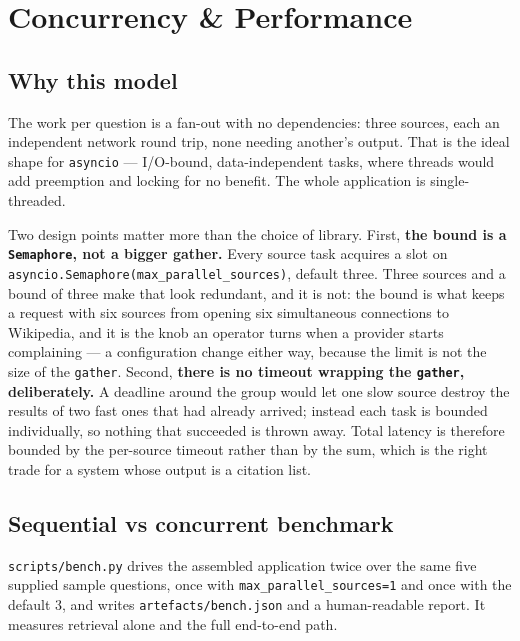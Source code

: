\documentclass[10pt,a4paper]{article}
\begin{document}
\section{Concurrency \& Performance}

\subsection{Why this model}

The work per question is a fan-out with no dependencies: three sources, each an independent
network round trip, none needing another's output. That is the ideal shape for \texttt{asyncio}
--- I/O-bound, data-independent tasks, where threads would add preemption and locking for no
benefit. The whole application is single-threaded.

Two design points matter more than the choice of library. First, \textbf{the bound is a
\texttt{Semaphore}, not a bigger gather.} Every source task acquires a slot on
\texttt{asyncio.Semaphore(max\_parallel\_sources)}, default three. Three sources and a bound of
three make that look redundant, and it is not: the bound is what keeps a request with six
sources from opening six simultaneous connections to Wikipedia, and it is the knob an operator
turns when a provider starts complaining --- a configuration change either way, because the
limit is not the size of the \texttt{gather}. Second, \textbf{there is no timeout wrapping the
\texttt{gather}, deliberately.} A deadline around the group would let one slow source destroy
the results of two fast ones that had already arrived; instead each task is bounded
individually, so nothing that succeeded is thrown away. Total latency is therefore bounded by
the per-source timeout rather than by the sum, which is the right trade for a system whose
output is a citation list.

\subsection{Sequential vs concurrent benchmark}

\texttt{scripts/bench.py} drives the assembled application twice over the same five supplied
sample questions, once with \texttt{max\_parallel\_sources=1} and once with the default 3, and
writes \texttt{artefacts/bench.json} and a human-readable report. It measures retrieval alone and
the full end-to-end path.
\end{document}
